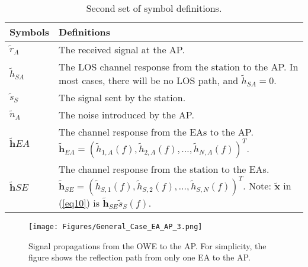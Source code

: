 \begin{table}
\centering
\begin{tabularx}{0.48\textwidth}{l L}
\toprule
\textbf{Symbols}&\textbf{Definitions}\\  \midrule 
${{\tilde r}_{A}}$&The received signal at the AP.\\ [0.1cm]
${{\tilde h}}_{SA}$&The LOS channel response from the station to the AP. In most cases, there will be no LOS path, and ${{\tilde h}}_{SA}=0$.\\ [0.5cm]
${{\tilde s}_{S}}$&The signal sent by the station.\\ [0.15cm]
${{\tilde n}_{A}}$&The noise introduced by the AP.\\ [0.1cm]
${\mathbf{\tilde h}}{\scriptscriptstyle EA}$& The channel response from the EAs to the AP. \newline ${{\mathbf{\tilde h}}_{EA}} = {\left( {{{\tilde h}_{1,A}}\left( f \right),{{\tilde h}_{2,A}}\left( f \right), \ldots ,{{\tilde h}_{N,A}}\left( f \right)} \right)^T}$. \\ [0.7 cm] 
${\mathbf{\tilde h}}{\scriptscriptstyle SE}$& The channel response from the station to the EAs. \newline ${{\mathbf{\tilde h}}_{SE}} = {\left( {{{\tilde h}_{S,1}}\left( f \right),{{\tilde h}_{S,2}}\left( f \right), \ldots ,{{\tilde h}_{S,N}}\left( f \right)} \right)^T}$. \newline Note: $\mathbf{\tilde x}$ in (\ref{eq10}) is ${{\mathbf{\tilde h}}_{SE}}{{\tilde s}_{S}}\left( f \right)$. \\
\bottomrule
\end{tabularx}
\caption{Second set of symbol definitions.}
\label{Table2}
\vspace{-0.4cm}
\end{table}

\begin{figure}
\centering
\texttt{[image: Figures/General\_Case\_EA\_AP\_3.png]}
\caption{Signal propagations from the OWE to the AP. For simplicity, the figure shows the reflection path from only one EA to the AP.}
\label{ea_ap}
\vspace{-0.5cm}
\end{figure}

